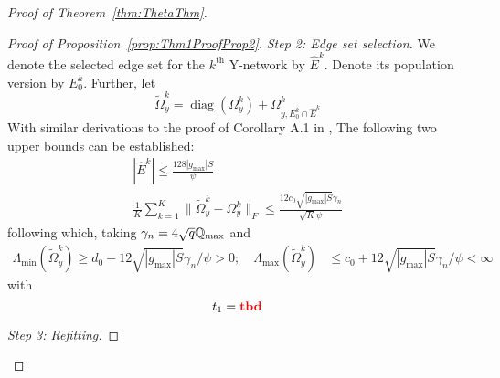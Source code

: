 \documentclass[12pt, letterpaper]{article}
\theoremstyle{definition}
\DeclareMathOperator*{\diag}{diag }
\numberwithin{equation}{section}
\begin{document}
\begin{proof}[Proof of Theorem~\ref{thm:ThetaThm}]
\begin{proof}[Proof of Proposition~\ref{prop:Thm1ProofProp2}]
{\it Step 2: Edge set selection.} We denote the selected edge set for the $k^\text{th}$ Y-network by $\hat E^k$. Denote its population version by $E_0^k$. Further, let
%
$$
\tilde \Omega_y^k = \diag (\Omega_y^k) + \Omega_{y, E_0^k \cap \hat E^k}^k
$$
%
With similar derivations to the proof of Corollary A.1 in \cite{MaMichailidis15}, The following two upper bounds can be established:
%
\begin{align}
| \hat E^k | \leq \frac{ 128 | g_{\max} | S }{\psi}\\
\frac{1}{K} \sum_{k=1}^K \| \tilde \Omega_y^k - \Omega_y^k \|_F \leq
\frac{12 c_0 \sqrt{| g_{\max}| S} \gamma_n} {\sqrt K \psi}
\end{align}
%
following which, taking $\gamma_n = 4 \sqrt q {\mathbb{Q}}_{\max}$ and 
%
\begin{align}
\Lambda_{\min} ( \tilde \Omega_y^k) \geq d_0 - 12 \sqrt{| g_{\max}| S} \gamma_n / \psi > 0; \quad
\Lambda_{\max} ( \tilde \Omega_y^k) & \leq c_0 + 12 \sqrt{| g_{\max}| S} \gamma_n / \psi < \infty
\end{align}
%
with
%
$$
t_1 = {\color{red} \bf tbd}
$$

{\it Step 3: Refitting.}

\end{proof}


\end{proof}
\end{document}
